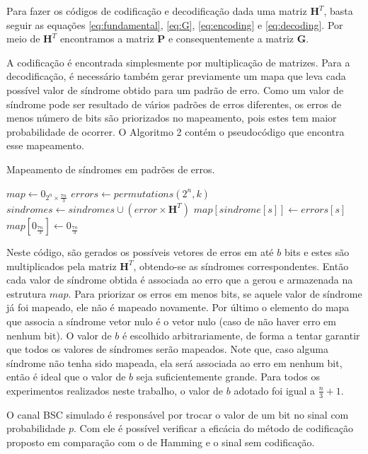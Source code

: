 Para fazer os códigos de codificação e decodificação dada uma matriz $\textbf{H}^T$, basta seguir as equações \ref{eq:fundamental}, \ref{eq:G}, \ref{eq:encoding} e \ref{eq:decoding}. Por meio de $\textbf{H}^T$ encontramos a matriz $\textbf{P}$ e consequentemente a matriz $\textbf{G}$. 

A codificação é encontrada simplesmente por multiplicação de matrizes. Para a decodificação, é necessário também gerar previamente um mapa que leva cada possível valor de síndrome obtido para um padrão de erro. Como um valor de síndrome pode ser resultado de vários padrões de erros diferentes, os erros de menos número de bits são priorizados no mapeamento, pois estes tem maior probabilidade de ocorrer. O Algoritmo 2 contém o pseudocódigo que encontra esse mapeamento.

\begin{algorithm}
\label{alg:mapeamento}
\caption{Mapeamento de síndromes em padrões de erros.}
\begin{algorithmic}[1]
\State $map \gets 0_{2^n \times \frac{7n}{3}}$
    \State $errors \gets permutations(2^n, k)$
        \State $sindromes \gets sindromes \cup (error \times \textbf{H}^T)$
    \EndFor
            \State $map[sindrome[s]] \gets errors[s]$            
        \EndIf
    \EndFor
\EndFor
\State $map[0_{\frac{7n}{3}}] \gets 0_{\frac{7n}{3}}$
\end{algorithmic}
\end{algorithm}

Neste código, são gerados os possíveis vetores de erros em até $b$ bits e estes são multiplicados pela matriz $\textbf{H}^T$, obtendo-se as síndromes correspondentes. Então cada valor de síndrome obtida é associada ao erro que a gerou e armazenada na estrutura $map$. Para priorizar os erros em menos bits, se aquele valor de síndrome já foi mapeado, ele não é mapeado novamente. Por último o elemento do mapa que associa a síndrome vetor nulo é o vetor nulo (caso de não haver erro em nenhum bit). O valor de $b$ é escolhido arbitrariamente, de forma a tentar garantir que todos os valores de síndromes serão mapeados. Note que, caso alguma síndrome não tenha sido mapeada, ela será associada ao erro em nenhum bit, então é ideal que o valor de $b$ seja suficientemente grande. Para todos os experimentos realizados neste trabalho, o valor de $b$ adotado foi igual a $\frac{n}{3} + 1$.

O canal BSC simulado é responsável por trocar o valor de um bit no sinal com probabilidade $p$. Com ele é possível verificar a eficácia do método de codificação proposto em comparação com o de Hamming e o sinal sem codificação.
